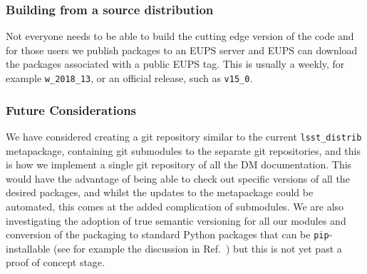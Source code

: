 \subsubsection{Building from a source distribution}

Not everyone needs to be able to build the cutting edge version of the code and for those users we publish packages to an EUPS server and EUPS can download the packages associated with a public EUPS tag.
This is usually a weekly, for example \texttt{w\_2018\_13}, or an official release, such as \texttt{v15\_0}.

\subsubsection{Future Considerations}

We have considered creating a git repository similar to the current \texttt{lsst\_distrib} metapackage, containing git submodules to the separate git repositories, and this is how we implement a single git repository of all the DM documentation.
This would have the advantage of being able to check out specific versions of all the desired packages, and whilst the updates to the metapackage could be automated, this comes at the added complication of submodules.
We are also investigating the adoption of true semantic versioning\cite{semver} for all our modules and conversion of the packaging to standard Python packages that can be \texttt{pip}-installable (see for example the discussion in Ref.~) but this is not yet past a proof of concept stage.
